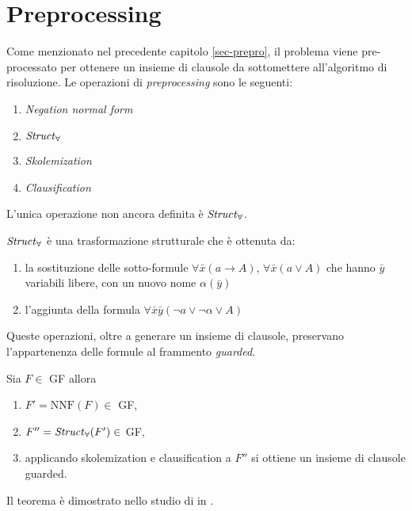 \section{Preprocessing}
Come menzionato nel precedente capitolo \ref{sec-prepro}, il problema viene pre-processato per ottenere un insieme di clausole 
da sottomettere all'algoritmo di risoluzione. Le operazioni di \emph{preprocessing} sono le seguenti:
\begin{enumerate}
    \item \emph{Negation normal form} 
    \item $\text{\emph{Struct}}_\forall$
    \item \emph{Skolemization}
    \item \emph{Clausification}
\end{enumerate} 
L'unica operazione non ancora definita è $\text{\emph{Struct}}_\forall$.
\begin{definition}
    $\text{\emph{Struct}}_\forall$ è una trasformazione strutturale che è ottenuta da:
    \begin{enumerate}
        \item la sostituzione delle sotto-formule $\forall\bar{x}(a \rightarrow A)$, $\forall\bar{x}(a \lor A)$ che hanno 
        $\bar{y}$ variabili libere, con un nuovo nome $\alpha(\bar{y})$
        \item l'aggiunta della formula $\forall\bar{x}\bar{y}(\lnot a \lor \lnot\alpha \lor A)$
    \end{enumerate}
\end{definition}
Queste operazioni, oltre a generare un insieme di clausole, preservano l'appartenenza delle formule al frammento \emph{guarded}.
\begin{theorem}
    Sia $F\in$ GF allora 
    \begin{enumerate}
        \item $F'=\text{NNF}(F) \in$ GF,
        \item $F''=\text{\emph{Struct}}_\forall(F') \in$ GF,
        \item applicando skolemization e clausification a $F''$ si ottiene un insieme di clausole guarded.
    \end{enumerate}
\end{theorem}
Il teorema è dimostrato nello studio di \citeauthor{de2003deciding} in \cite{de2003deciding}.
